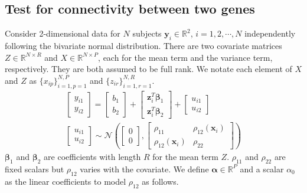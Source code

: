 \documentclass[aap,authoryear, preprint]{imsart}
\numberwithin{equation}{section}
\theoremstyle{plain}
\begin{document}
\subsection{Test for connectivity between two genes \label{sec:framework2}}
Consider 2-dimensional data for $N$ subjects $\bm{y}_i \in \mathbb{R}^2$, $i = 1, 2, \cdots, N$ independently following the bivariate normal distribution. There are two covariate matrices $Z \in \mathbb{R}^{N \times R}$ and $X \in \mathbb{R}^{N \times P}$, each for the mean term and the variance term, respectively. They are both assumed to be full rank. We notate each element of $X$ and $Z$ as $\{x_{ip}\}_{i=1,p=1}^{N,P}$ and $\{z_{ir}\}_{i=1,r=1}^{N,R}$.
\begin{equation}
\begin{multlined}
    \begin{bmatrix} y_{i1} \\ y_{i2} \end{bmatrix} = 
    \begin{bmatrix} b_{1} \\ b_{2} \end{bmatrix} + 
    \begin{bmatrix} \bm{z}_i^T \bm{\beta}_1 \\ \bm{z}_i^T \bm{\beta}_2 \end{bmatrix} + 
    \begin{bmatrix} {u_{i1}} \\ {u_{i2}} \end{bmatrix}\\
    \begin{bmatrix} {u_{i1}} \\ u_{i2} \end{bmatrix} 
    \sim \mathcal{N}\left(
        \begin{bmatrix} 0 \\ 0 \end{bmatrix}, 
        \begin{bmatrix} \rho_{11} & \rho_{12}(\bm{x}_i) \\ 
        \rho_{12}(\bm{x}_i) & \rho_{22} \end{bmatrix}
    \right)
    \end{multlined}
    \label{eq:framework_2genes}
\end{equation}
$\bm{\beta}_1$ and $\bm{\beta}_2$ are coefficients with length $R$  for the mean term $Z$. $\rho_{11}$ and $\rho_{22}$ are fixed scalars but $\rho_{12}$ varies with the covariate. We define $\bm{\alpha} \in \mathbb{R}^{P}$ and a scalar $\alpha_0$ as the linear coefficients to model $\rho_{12}$ as follows.
\end{document}
